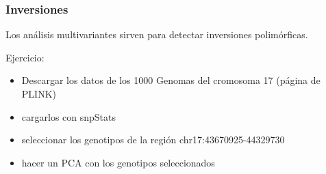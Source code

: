 \documentclass{beamer}\usepackage[]{graphicx}\usepackage[]{color}
\begin{document}
\begin{frame}[fragile]
\frametitle{Inversiones}

Los an\'alisis multivariantes sirven para detectar inversiones polim\'orficas.

Ejercicio:
\begin{itemize}
\item Descargar los datos de los 1000 Genomas del cromosoma 17 (p\'agina de PLINK)
\item cargarlos con snpStats
\item seleccionar los genotipos de la regi\'on chr17:43670925-44329730
\item hacer un PCA con los genotipos seleccionados
\end{itemize}

\end{frame}
\end{document}

